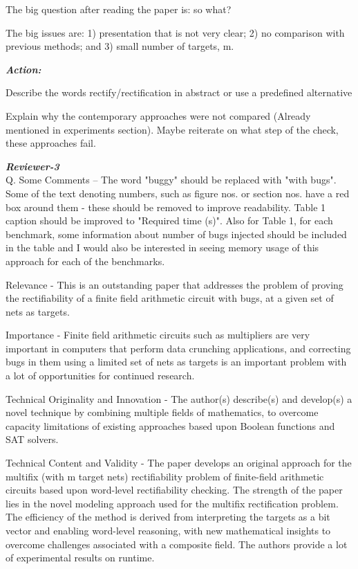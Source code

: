 The big question after reading the paper is: so what?

The big issues are: 1) presentation that is not very clear; 2) no comparison with previous methods; and 3) small number of targets, m.

\par {\it{\bf Action:}}
\bi
\item Describe the words rectify/rectification in abstract or use a predefined alternative
\item Explain why the contemporary approaches were not compared (Already mentioned in experiments section).
Maybe reiterate on what step of the check, these approaches fail.
\item 
\ei

\par {\it{\bf Reviewer-3}}\\
Q. Some Comments -- The word "buggy" should be replaced with "with bugs".  Some of the text denoting numbers, such as figure nos. or section nos. have a red box around them - these should be removed to improve readability.  Table 1 caption should be improved to "Required time (s)". Also  for Table 1, for each benchmark, some information about number of bugs injected should be included in the table and I would also be interested in seeing memory usage of this approach for each of the benchmarks.

Relevance - This is an outstanding paper that addresses the problem of proving the rectifiability of a finite field arithmetic circuit with bugs, at a given set of nets as targets.

Importance - Finite field arithmetic circuits such as multipliers are very important in computers that perform data crunching applications, and correcting bugs in them using a limited set of nets as targets is an important problem with a lot of opportunities for continued research.

Technical Originality and Innovation - The author(s) describe(s) and develop(s) a novel technique by combining multiple fields of mathematics, to overcome capacity limitations of existing approaches based upon Boolean functions and SAT solvers. 

Technical Content and Validity - The paper develops an original approach for the multifix (with m target nets) rectifiability problem of finite-field arithmetic circuits based upon word-level rectifiability checking.  The strength of the paper lies in the novel modeling approach used for the multifix rectification problem. The efficiency of the method is derived from interpreting the targets as a bit vector and enabling word-level reasoning, with new mathematical insights to overcome challenges associated with a composite field. The authors provide a lot of experimental results on runtime.

